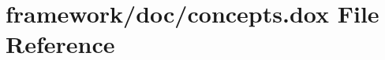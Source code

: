 \hypertarget{concepts_8dox}{}\section{framework/doc/concepts.dox File Reference}
\label{concepts_8dox}
